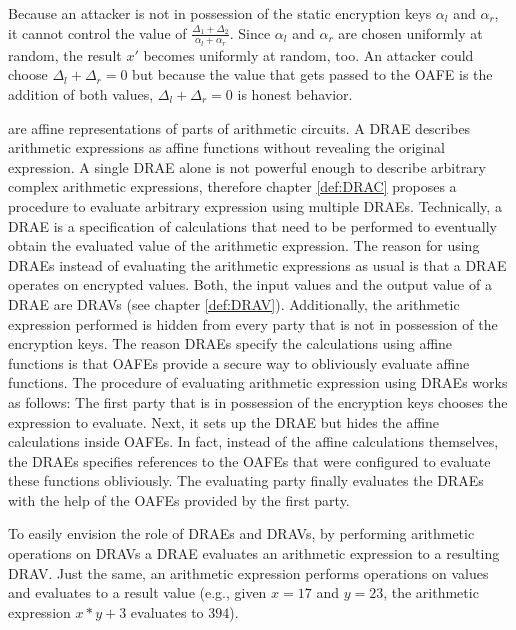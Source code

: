 Because an attacker is not in possession of the static encryption keys
$\alpha_l$ and $\alpha_r$, it cannot control the value of $\frac{\Delta_1 +
\Delta_2}{\alpha_l + \alpha_r}$. Since $\alpha_l$ and $\alpha_r$ are chosen
uniformly at random, the result $x'$ becomes uniformly at random, too. An
attacker could choose $\Delta_l + \Delta_r = 0$ but because the value that gets
passed to the OAFE is the addition of both values, $\Delta_l + \Delta_r = 0$ is
honest behavior.


%
%
\label{sec:drae}

 are affine representations of
parts of arithmetic circuits. A DRAE describes arithmetic expressions as affine
functions without revealing the original expression. A single DRAE alone is not
powerful enough to describe arbitrary complex arithmetic expressions, therefore
chapter \ref{def:DRAC} proposes a procedure to evaluate arbitrary expression
using multiple DRAEs. Technically, a DRAE is a specification of calculations
that need to be performed to eventually obtain the evaluated value of the
arithmetic expression. The reason for using DRAEs instead of evaluating the
arithmetic expressions as usual is that a DRAE operates on encrypted values.
Both, the input values and the output value of a DRAE are DRAVs (see chapter
\ref{def:DRAV}). Additionally, the arithmetic expression performed is hidden
from every party that is not in possession of the encryption keys. The reason
DRAEs specify the calculations using affine functions is that OAFEs provide
a secure way to obliviously evaluate affine functions. The procedure of
evaluating arithmetic expression using DRAEs works as follows: The first party
that is in possession of the encryption keys chooses the expression to evaluate.
Next, it sets up the DRAE but hides the affine calculations inside OAFEs. In
fact, instead of the affine calculations themselves, the DRAEs specifies
references to the OAFEs that were configured to evaluate these functions
obliviously. The evaluating party finally evaluates the DRAEs with the help of
the OAFEs provided by the first party.

To easily envision the role of DRAEs and DRAVs, by performing arithmetic
operations on DRAVs a DRAE evaluates an arithmetic expression to a resulting
DRAV\@. Just the same, an arithmetic expression performs operations on values
and evaluates to a result value (e.g., given $x=17$ and $y=23$, the arithmetic
expression $x*y + 3$ evaluates to $394$).

